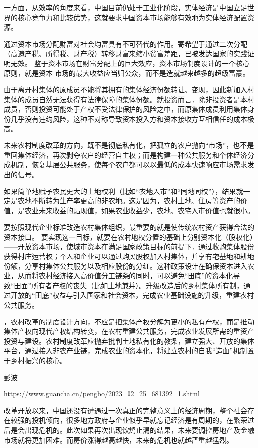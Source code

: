 一方面，从效率的角度来看，中国目前仍处于工业化阶段，实体经济是中国立足世界的核心竞争力和比较优势，这就要求中国资本市场能够有效地为实体经济配置资源。

通过资本市场分配财富对社会均富具有不可替代的作用。寄希望于通过二次分配（高遗产税、所得税、财产税）转移财富来缩小贫富差距，已被发达国家的实践证明无效。
鉴于资本市场在财富分配上的巨大效应，资本市场制度设计的一个核心原则，就是资本
市场的最大收益应当归公众，而不是造就越来越多的超级富豪。

由于离开村集体的原成员不能将其拥有的集体经济份额转让、变现，因此新加入村集体的成员自然无法获得有法律保障的集体份额。就投资而言，除非投资者是本村成员，否则投资可能处于产权不受法律保护的风险之中，而原集体成员利用集体身份几乎没有违约风险，这种不对称导致资本投入方和资本接收方互相信任的成本极高。

未来农村制度改革的方向，既不是彻底私有化，把孤立的农户抛向“市场”，也不是重回集体经济，再次剥夺农户的经营自主权；而是构建一种公共服务和个体经济分成机制，恢复基层公共服务，使每个农户都可以以最低的成本快速响应市场需求发出的信号。

如果简单地赋予农民更大的土地权利（比如“农地入市”和“同地同权”），结果就一定是农地不断转为生产率更高的非农地。这是因为，农村土地、住房等资产的价值，是农业未来收益的贴现值，如果农业收益少，农地、农宅入市价值也就很小。

要按照现代企业标准改造农村集体组织，最重要的就是使传统农村资产获得合法的资本接口。
要实现这一目标，就要在农村地权分置的基础上分别资本化（股权化）——开放资本市场，使城市资本在满足国家政策目标的前提下，通过收购集体股份获得村庄运营权；个人和企业可以通过购买股权加入村集体，并享有宅基地和耕地份额，分享村集体公共服务以及相应股份的分红。这种政策设计在确保资本进入农业，从而将农村经济接入高价值分工链条的同时，可以避免“田底”的资本化导致“田面”所有者产权的丧失（比如土地兼并）。升级改造后的乡村集体所有制，通过开放的“田底”权益与引入国家和社会资本，完成农业基础设施的升级，重建农村公共服务。


，农村改革的制度设计方向，不应是把集体产权分解为更小的私有产权，而是推动集体产权向现代产权结构转变，在农村重建公共服务，完成农业发展所需的重资产投资与建设。农村制度改革应抛弃批判土地私有化的教条，建立强大、开放的集体平台，通过接入非农产业链，完成农业的资本化，将建立农村的自我“造血”机制置于乡村振兴的核心。




彭波

https://www.guancha.cn/pengbo/2023_02_25_681392_1.shtml

改革开放以来，中国还没有遭遇过一次真正的完整意义上的经济周期，整个社会存在较强的投机倾向，很多地方政府与企业似乎早就忘记经济是有周期的，在繁荣过后是会出现危机的。此次如果再次出现饮鸩止渴的结果，未来要调控房地产及金融市场就将更加困难。而房价涨得越高越快，未来的危机也就越严重越猛烈。


